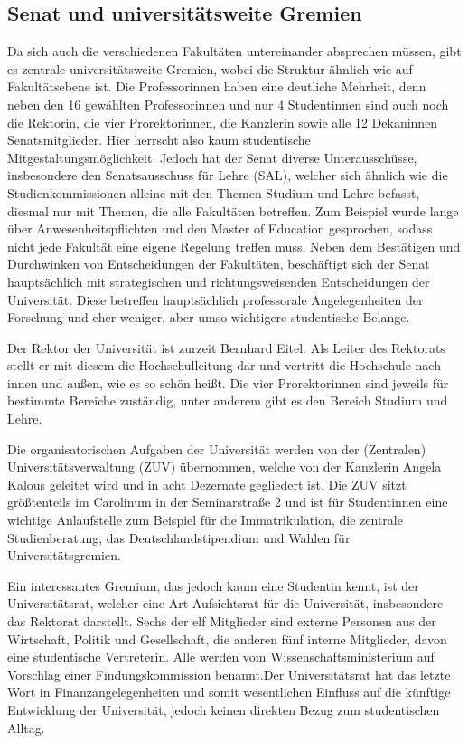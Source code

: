 \subsection{Senat und universitätsweite Gremien}
Da sich auch die verschiedenen Fakultäten untereinander absprechen müssen, gibt es zentrale universitätsweite Gremien, wobei die Struktur ähnlich wie auf Fakultätsebene ist. Die Professorinnen haben eine deutliche Mehrheit, denn neben den 16 gewählten Professorinnen und nur 4 Studentinnen sind auch noch die Rektorin, die vier Prorektorinnen, die Kanzlerin sowie alle 12 Dekaninnen Senatsmitglieder. Hier herrscht also kaum studentische Mitgestaltungsmöglichkeit. Jedoch hat der Senat diverse Unterausschüsse, insbesondere den Senatsausschuss für Lehre (SAL), welcher sich ähnlich wie die Studienkommissionen alleine mit den Themen Studium und Lehre befasst, diesmal nur mit Themen, die alle Fakultäten betreffen. Zum Beispiel wurde lange über Anwesenheitspflichten und den Master of Education gesprochen, sodass nicht jede Fakultät eine eigene Regelung treffen muss. Neben dem Bestätigen und Durchwinken von Entscheidungen der Fakultäten, beschäftigt sich der Senat hauptsächlich mit strategischen und richtungsweisenden Entscheidungen der Universität. 
Diese betreffen hauptsächlich professorale Angelegenheiten der Forschung und eher weniger, aber umso wichtigere studentische Belange. 

Der Rektor der Universität ist zurzeit Bernhard Eitel. Als Leiter des Rektorats stellt er mit diesem die Hochschulleitung dar und vertritt die Hochschule nach innen und außen, wie es so schön heißt. Die vier Prorektorinnen sind jeweils für bestimmte Bereiche zuständig, unter anderem gibt es den Bereich Studium und Lehre. 

Die organisatorischen Aufgaben der Universität werden von der (Zentralen) Universitätsverwaltung (ZUV) übernommen, welche von der Kanzlerin Angela Kalous geleitet wird und in acht Dezernate gegliedert ist. Die ZUV sitzt größtenteils im Carolinum in der Seminarstraße 2 und ist für Studentinnen eine wichtige Anlaufstelle zum Beispiel für die Immatrikulation, die zentrale Studienberatung, das Deutschlandstipendium und Wahlen für Universitätsgremien.

Ein interessantes Gremium, das jedoch kaum eine Studentin kennt, ist der Universitätsrat, welcher eine Art Aufsichtsrat für die Universität, insbesondere das Rektorat darstellt. Sechs der elf Mitglieder sind externe Personen aus der Wirtschaft, Politik und Gesellschaft, die anderen fünf interne Mitglieder, davon eine studentische Vertreterin. Alle werden vom Wissenschaftsministerium auf Vorschlag einer Findungskommission benannt.Der Universitätsrat hat das letzte Wort in Finanzangelegenheiten und somit wesentlichen Einfluss auf die künftige Entwicklung der Universität, jedoch keinen direkten Bezug zum studentischen Alltag.

